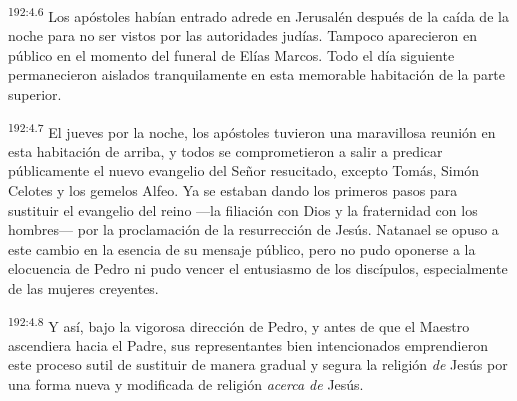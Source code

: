 \par 
\textsuperscript{192:4.6} Los apóstoles habían entrado adrede en Jerusalén después de la caída de la noche para no ser vistos por las autoridades judías. Tampoco aparecieron en público en el momento del funeral de Elías Marcos. Todo el día siguiente permanecieron aislados tranquilamente en esta memorable habitación de la parte superior.

\par 
\textsuperscript{192:4.7} El jueves por la noche, los apóstoles tuvieron una maravillosa reunión en esta habitación de arriba, y todos se comprometieron a salir a predicar públicamente el nuevo evangelio del Señor resucitado, excepto Tomás, Simón Celotes y los gemelos Alfeo. Ya se estaban dando los primeros pasos para sustituir el evangelio del reino ---la filiación con Dios y la fraternidad con los hombres--- por la proclamación de la resurrección de Jesús. Natanael se opuso a este cambio en la esencia de su mensaje público, pero no pudo oponerse a la elocuencia de Pedro ni pudo vencer el entusiasmo de los discípulos, especialmente de las mujeres creyentes.

\par 
\textsuperscript{192:4.8} Y así, bajo la vigorosa dirección de Pedro, y antes de que el Maestro ascendiera hacia el Padre, sus representantes bien intencionados emprendieron este proceso sutil de sustituir de manera gradual y segura la religión \textit{de} Jesús por una forma nueva y modificada de religión \textit{acerca de} Jesús.